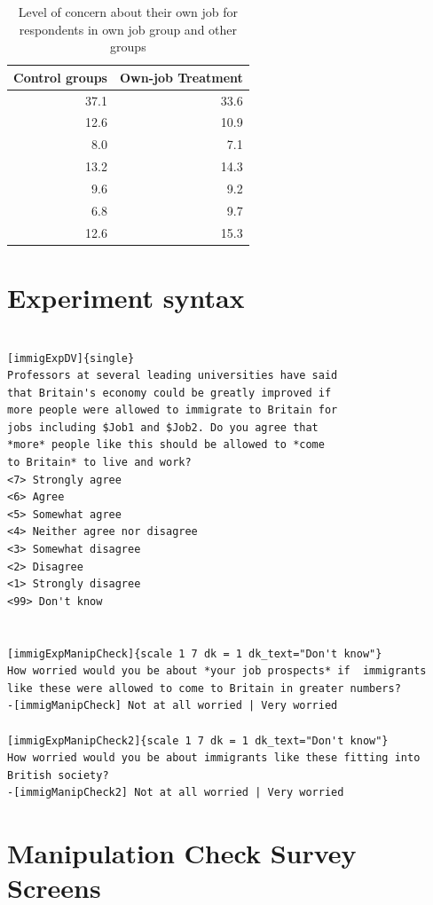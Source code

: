 \documentclass{article}\usepackage[]{graphicx}\usepackage[]{color}
\begin{document}
\begin{appendix}
\begin{table}

\caption{Level of concern about their own job for respondents in own job group and other groups}
\begin{tabular}{r|r}
\hline
Control groups & Own-job Treatment\\
\hline
37.1 & 33.6\\
\hline
12.6 & 10.9\\
\hline
8.0 & 7.1\\
\hline
13.2 & 14.3\\
\hline
9.6 & 9.2\\
\hline
6.8 & 9.7\\
\hline
12.6 & 15.3\\
\hline
\end{tabular}
\end{table}



\section{Experiment syntax} 
\label{appendix:experimentsyntax}

\begin{verbatim}

[immigExpDV]{single} 
Professors at several leading universities have said 
that Britain's economy could be greatly improved if 
more people were allowed to immigrate to Britain for
jobs including $Job1 and $Job2. Do you agree that 
*more* people like this should be allowed to *come
to Britain* to live and work?
<7> Strongly agree
<6> Agree
<5> Somewhat agree
<4> Neither agree nor disagree
<3> Somewhat disagree
<2> Disagree
<1> Strongly disagree
<99> Don't know


[immigExpManipCheck]{scale 1 7 dk = 1 dk_text="Don't know"}
How worried would you be about *your job prospects* if  immigrants 
like these were allowed to come to Britain in greater numbers?
-[immigManipCheck] Not at all worried | Very worried

[immigExpManipCheck2]{scale 1 7 dk = 1 dk_text="Don't know"} 
How worried would you be about immigrants like these fitting into British society?
-[immigManipCheck2] Not at all worried | Very worried

\end{verbatim}


\section{Manipulation Check Survey Screens}  \label{app:manipCheckScreens}


\end{appendix}
\end{document}
